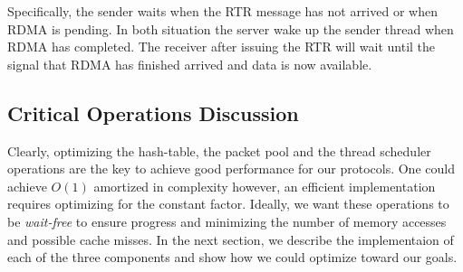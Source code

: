 Specifically, the sender waits when the RTR message has not arrived or when
RDMA is pending. In both situation the server wake up the sender thread when
RDMA has completed. The receiver after issuing the RTR will wait until the
signal that RDMA has finished arrived and data is now available.

\subsection{Critical Operations Discussion}
Clearly, optimizing the hash-table, the packet pool and the thread scheduler
operations are the key to achieve good performance for our protocols. One could
achieve $O(1)$ amortized in complexity however, an efficient implementation
requires optimizing for the constant factor. Ideally, we want these operations
to be \textit{wait-free} to ensure progress and minimizing the number of memory
accesses and possible cache misses. In the next section, we describe the
implementaion of each of the three components and show how we could optimize
toward our goals.
